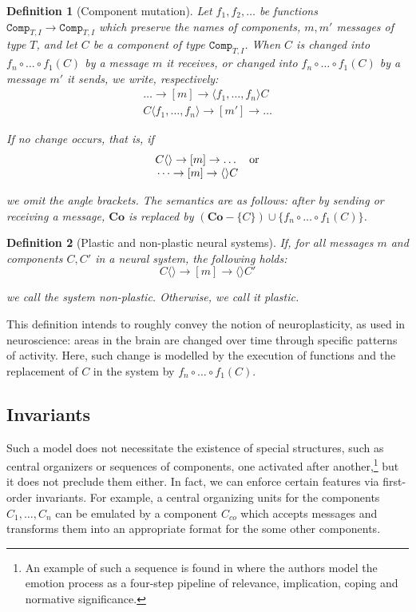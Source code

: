\documentclass[]{scrartcl}
\theoremstyle{break}
\newtheorem{definition}{Definition}
\newcommand{\mt}[1]{\textnormal{#1}}
\renewcommand{\tt}[1]{\texttt{#1}}
\newcommand{\co}{\mathbf{Co}}
\newcommand{\compT}[2]{\tt{Comp}_{#1,#2}}
\begin{document}
\begin{definition}[Component mutation]
	Let $f_1,f_2,\dots$ be functions $\compT{T}{I} \rightarrow \compT{T}{I}$ which preserve the names of components, $m,m'$ messages of type $T$, and let $C$ be a component of type $\compT{T}{I}$. When $C$ is changed into $f_n \circ \dots \circ f_1 (C)$ by a message $m$ it receives, or changed into $f_n \circ \dots \circ f_1 (C)$ by a message $m'$ it sends, we write, respectively:
	$$
		\begin{array}{c}
			\dots \rightarrow [m] \rightarrow \langle f_1,\dots,f_n \rangle C\\
			C\langle f_1,\dots,f_n \rangle \rightarrow [m'] \rightarrow \dots
		\end{array}
	$$
	
	\noindent
	If no change occurs, that is, if
	$$
		\begin{array}{r l}
			C\langle\rangle \rightarrow [m] \rightarrow \dots & \mt{or}\\
			\dots \rightarrow [m] \rightarrow \langle\rangle C
		\end{array}
	$$
	
	\noindent
	we omit the angle brackets.
	The semantics are as follows: after by sending or receiving a message, $\co$ is replaced by $(\co - \{C\}) \cup \{f_n \circ \dots \circ f_1 (C) \}$.
\end{definition}

\begin{definition}[Plastic and non-plastic neural systems]
	If, for all messages $m$ and components $C, C'$ in a neural system, the following holds:
	$$
		C\langle\rangle \rightarrow [m] \rightarrow \langle\rangle C'
	$$
	
	\noindent
	we call the system non-plastic. Otherwise, we call it plastic.
\end{definition}


This definition intends to roughly convey the notion of neuroplasticity, as used in neuroscience: areas in the brain are changed over time through specific patterns of activity. Here, such change is modelled by the execution of functions and the replacement of $C$ in the system by $f_n \circ \dots \circ f_1 (C)$.

\subsection{Invariants}

Such a model does not necessitate the existence of special structures, such as central organizers or sequences of components, one activated after another,\footnote{An example of such a sequence is found in \cite{DBLP:journals/nn/SanderGS05} where the authors model the emotion process as a four-step pipeline of relevance, implication, coping and normative significance.} but it does not preclude them either. In fact, we can enforce certain features via first-order invariants. For example, a central organizing units for the components $C_1,\dots,C_n$ can be emulated by a component $C_{co}$ which accepts messages and transforms them into an appropriate format for the some other components.
\end{document}
